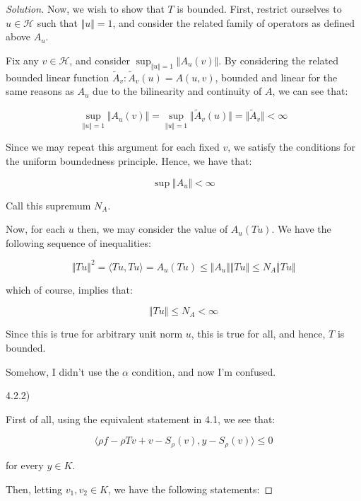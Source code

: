 \documentclass[10pt]{article}
\begin{document}
\begin{proof}[Solution]



Now, we wish to show that $T$ is bounded. First, restrict ourselves to $u \in \mathcal{H}$ such that $\Vert u \Vert =1$, and consider the related family of operators as defined above $A_u$.

Fix any $v \in \mathcal{H}$, and consider $\sup_{\Vert u \Vert = 1} \Vert A_u(v) \Vert$. By considering the related bounded linear function $\tilde{A}_v: \tilde{A}_v(u) = A(u, v)$, bounded and linear for the same reasons as $A_u$ due to the bilinearity and continuity of $A$, we can see that:

$$\sup_{\Vert u \Vert = 1} \Vert A_u(v) \Vert = \sup_{\Vert u \Vert = 1} \Vert \tilde{A}_v(u) \Vert = \Vert \tilde{A}_v \Vert < \infty$$

Since we may repeat this argument for each fixed $v$, we satisfy the conditions for the uniform boundedness principle. Hence, we have that:

$$ \sup \Vert A_u \Vert < \infty $$

Call this supremum $N_A$.

Now, for each $u$ then, we may consider the value of $A_u(Tu)$. We have the following sequence of inequalities:

$$ \Vert Tu \Vert^2 = \langle Tu, Tu \rangle=A_u(Tu) \leq \Vert A_u \Vert \Vert Tu \Vert \leq N_A \Vert Tu \Vert$$

which of course, implies that:

$$ \Vert Tu \Vert \leq N_A < \infty$$

Since this is true for arbitrary unit norm $u$, this is true for all, and hence, $T$ is bounded.

Somehow, I didn't use the $\alpha$ condition, and now I'm confused.

4.2.2)

First of all, using the equivalent statement in 4.1, we see that:

$$ \langle \rho f - \rho Tv + v - S_\rho(v), y - S_\rho(v) \rangle \leq 0$$

for every $y \in K$.

Then, letting $v_1, v_2 \in K$, we have the following statements:


\end{proof}
\end{document}
